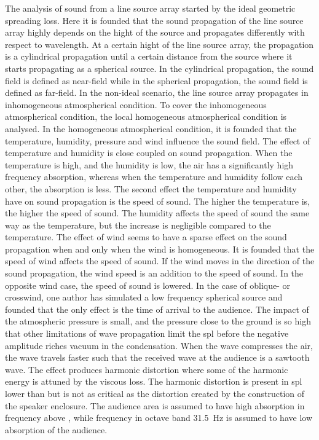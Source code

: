 The analysis of sound from a line source array started by the ideal geometric spreading loss. Here it is founded that the sound propagation of the line source array highly depends on the hight of the source and propagates differently with respect to wavelength. At a certain hight of the line source array, the propagation is a cylindrical propagation until a certain distance from the source where it starts propagating as a spherical source. In the cylindrical propagation, the sound field is defined as near-field while in the spherical propagation, the sound field is defined as far-field. In the non-ideal scenario, the line source array propagates in inhomogeneous atmospherical condition. To cover the inhomogeneous atmospherical condition, the local homogeneous atmospherical condition is analysed. In the homogeneous atmospherical condition, it is founded that the temperature, humidity, pressure and wind influence the sound field. The effect of temperature and humidity is close coupled on sound propagation. When the temperature is high, and the humidity is low, the air has a significantly high frequency absorption, whereas when the temperature and humidity follow each other, the absorption is less. The second effect the temperature and humidity have on sound propagation is the speed of sound. The higher the temperature is, the higher the speed of sound. The humidity affects the speed of sound the same way as the temperature, but the increase is negligible compared to the temperature. The effect of wind seems to have a sparse effect on the sound propagation when and only when the wind is homogeneous. It is founded that the speed of wind affects the speed of sound. If the wind moves in the direction of the sound propagation, the wind speed is an addition to the speed of sound. In the opposite wind case, the speed of sound is lowered. In the case of oblique- or crosswind, one author has simulated a low frequency spherical source and founded that the only effect is the time of arrival to the audience.  The impact of the atmospheric pressure is small, and the pressure close to the ground is so high that other limitations of wave propagation limit the \gls{spl} before the negative amplitude riches vacuum in the condensation. When the wave compresses the air, the wave travels faster such that the received wave at the audience is a sawtooth wave. The effect produces harmonic distortion where some of the harmonic energy is attuned by the viscous loss. The harmonic distortion is present in \gls{spl} lower than  but is not as critical as the distortion created by the construction of the speaker enclosure. 
The audience area is assumed to have high absorption in frequency above , while frequency in octave band \SI{31.5}{\hertz} is assumed to have low absorption of the audience. 


